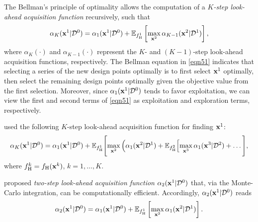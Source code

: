 \documentclass[journal ]{new-aiaa}
\begin{document}
The Bellman's principle of optimality allows the computation of a \textit{$K$-step look-ahead acquisition function} recursively, such that~\citep{Bellman1952}
\begin{equation}\label{eqn51}
	\alpha_K({\bf x}^1|\mathcal{D}^0)
	=\alpha_1({\bf x}^1|\mathcal{D}^0) + \mathbb{E}_{f^1_\text{H}}\left[\underset{{\bf x}^2}{\max}\,\alpha_{K-1}({\bf x}^2|\mathcal{D}^1)\right],
\end{equation}
where $\alpha_K(\cdot)$ and $\alpha_{K-1}(\cdot)$ represent the $K$- and $(K-1)$-step look-ahead acquisition functions, respectively.
The Bellman equation in \cref{eqn51} indicates that selecting a series of the new design points optimally is to first select ${\bf x}^1$ optimally, then select the remaining design points optimally given the objective value from the first selection.
Moreover, since $\alpha_1({\bf x}^1|\mathcal{D}^0)$ tends to favor exploitation, we can view the first and second terms of \cref{eqn51} as exploitation and exploration terms, respectively.

\citet{Jiang2020} used the following $K$-step look-ahead acquisition function for finding ${\bf x}^1$:
\begin{equation}\label{eqn52}
    \alpha_K({\bf x}^1|\mathcal{D}^0) = \alpha_1({\bf x}^1|\mathcal{D}^0) +\mathbb{E}_{f_\text{H}^1}\Bigg[\underset{{\bf x}^2}{\max}\,\Big(\alpha_1({{\bf x}}^2|\mathcal{D}^1) + 
    \mathbb{E}_{f_\text{H}^2}\Big[\underset{{\bf x}^3}{\max}\,\alpha_1({\bf x}^3|\mathcal{D}^2)+\dots  \Bigg],
\end{equation}
where $f^k_\text{H} = f_\text{H}({\bf x}^k)$, $k=1,\dots,K$.

\citet{WuJ2019} proposed \textit{two-step look-ahead acquisition function} $\alpha_2({\bf x}^1|\mathcal{D}^0)$ that, via the Monte-Carlo integration, can be computationally efficient.
Accordingly, $\alpha_2({\bf x}^1|\mathcal{D}^0)$ reads
\begin{equation}\label{eqn53}
		\alpha_2({\bf x}^1|\mathcal{D}^0) =\alpha_1({\bf x}^1|\mathcal{D}^0) + \mathbb{E}_{f^1_\text{H}}\left[\underset{{\bf x}^2}{\max}\,\alpha_1({\bf x}^2|\mathcal{D}^1)\right].
\end{equation}
\end{document}
